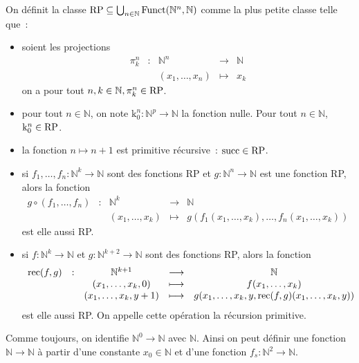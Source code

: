 \begin{definition}
  On définit la classe
  $\operatorname{RP}\subseteq \bigcup_{n \in \mathbb N}\operatorname{Funct}(\mathbb N^n,\mathbb N)$
  comme la plus petite classe telle que~:
  \begin{itemize}
  \item soient les projections
    \[\begin{array}{ccccc}
    \pi_k^n &:& \mathbb N^n &\longrightarrow& \mathbb N\\
    & & (x_1,\ldots,x_n) & \longmapsto & x_k
    \end{array}\]
    on a pour tout $n,k\in \mathbb N, \pi_k^n \in \operatorname{RP}$.
  \item pour tout $n \in \mathbb N$, on note
    $\mathrm k_0^n : \mathbb N^p \to \mathbb N$ la fonction nulle. Pour tout
    $n \in \mathbb N$, $\mathrm k_0^n \in \operatorname{RP}$.
  \item la fonction $n \mapsto n + 1$ est primitive récursive~: $\operatorname{succ}\in\operatorname{RP}$.
  \item si $f_1,\ldots,f_n : \mathbb N^k \to \mathbb N$ sont des fonctions RP
    et $g : \mathbb N^n \to \mathbb N$ est une fonction RP, alors la fonction
    \[\begin{array}{ccccc}
    g \circ (f_1,\ldots,f_n) & : & \mathbb N^k &\longrightarrow & \mathbb N\\
    & & (x_1,\ldots,x_k) & \longmapsto &
    g(f_1(x_1,\ldots,x_k),\ldots,f_n(x_1,\ldots,x_k))
    \end{array}\]
    est elle aussi RP.
  \item si $f : \mathbb N^k \to \mathbb N$ et
    $g : \mathbb N^{k+2} \to \mathbb N$ sont des fonctions RP, alors la fonction
    \[\begin{array}{ccccc}
    \operatorname{rec}(f,g) & : & \mathbb N^{k+1} &\longrightarrow & \mathbb N \\
    & & (x_1,\ldots,x_k,0) &\longmapsto & f(x_1,\ldots,x_k)\\
    & & (x_1,\ldots,x_k,y+1) & \longmapsto &
    g(x_1,\ldots,x_k,y,\operatorname{rec}(f,g)(x_1,\ldots,x_k,y))
    \end{array}\]
    est elle aussi RP. On appelle cette opération la récursion primitive.
  \end{itemize}
\end{definition}

\begin{remark}
  Comme toujours, on identifie $\mathbb N^0 \to \mathbb N$ avec $\mathbb N$.
  Ainsi on peut définir une fonction $\mathbb N \to \mathbb N$ à partir d'une
  constante $x_0 \in \mathbb N$ et d'une fonction
  $f_s : \mathbb N^2 \to \mathbb N$.
\end{remark}

